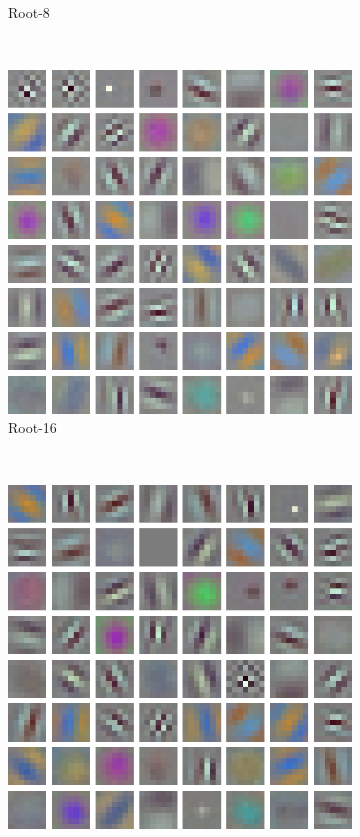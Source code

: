 \documentclass[thesis]{subfiles}
\begin{document}
\begin{figure}[tb]
\begin{subfigure}[b]{0.45\linewidth}
			\caption{Root-8}
			\label{fig:resnet50root8conv0}
		\end{subfigure}
		~
		\begin{subfigure}[b]{0.45\linewidth}
			\centering
			\includegraphics[width=\linewidth]{Figs/Raster/msrc-resnet-50-conv1-root32-convonly}
			\caption{Root-16}
			\label{fig:resnet50root16conv0}
		\end{subfigure}
		~
		\begin{subfigure}[b]{0.45\linewidth}
			\centering
			\includegraphics[width=\linewidth]{Figs/Raster/msrc-resnet-50-conv1-root64-convonly}

\end{subfigure}
\end{figure}
\end{document}
